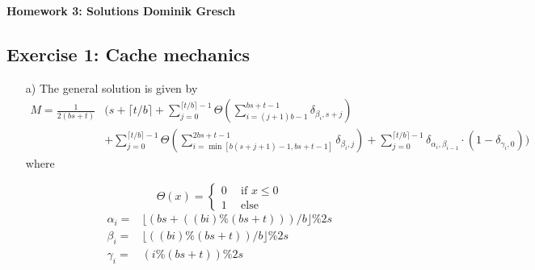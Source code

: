 \documentclass[11pt]{article}
\begin{document}
\hspace{0.2 in}
\begin{center}
	\begin{Large}
		\textbf{Homework 3: Solutions Dominik Gresch}
	\end{Large}
\end{center}
\subsection*{Exercise 1: Cache mechanics}
	\begin{itemize}
		\item[a)] The general solution is given by
		\begin{align*} 
		 M = \frac{1}{2(b s + t)}&\Bigg( s + \lceil t/b \rceil + \sum\limits_{j=0}^{\lceil t / b\rceil - 1} \Theta \left(\sum\limits_{i=(j+1)b-1}^{bs + t - 1} \delta_{\beta_i, s+j} \right)  \\ & + 
		\sum\limits_{j=0}^{\lceil t / b\rceil - 1} \Theta \left(\sum\limits_{i=\min[b(s+j+1)-1, b s + t -1 ]}^{2bs + t - 1} \delta_{\beta_i, j} \right)  + \sum\limits_{j=0}^{\lceil t/b \rceil - 1} \delta_{\alpha_i,\beta_{i-1}}\cdot\left(1-\delta_{\gamma_i,0}\right) \Bigg)
		\end{align*}
		where 

		\[ \Theta(x) = \left\{
			\begin{array}{ll}
				0~~  & \text{if } x \leq 0 \\
				1 & \text{else}
			\end{array} \right.  \]
		\begin{align*}
			\alpha_i =& \lfloor (bs + ((bi)\%(bs + t)))/b \rfloor\%2s\\
			\beta_i =& \lfloor ((bi)\%(bs + t))/b \rfloor\%2s\\
			\gamma_i =& (i\%(bs + t))\%2s
		\end{align*}
		

\end{itemize}
\end{document}
